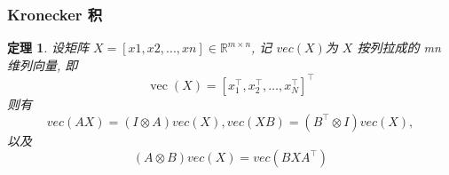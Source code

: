 \documentclass[notheorems,serif]{beamer}
\newcommand{\hei}[1]{{\HEI#1}}
\newtheorem{theorem}{\hei{定理}}
\begin{document}
\begin{frame}
\frametitle{Kronecker 积}
\begin{theorem}
	设矩阵 $X = [x1, x2, . . . , xn] ∈ \mathbb{R}^{
		m×n}$, 记 $vec(X)$为 $X$ 按列拉成的
	mn 维列向量, 即
	$$
	\operatorname{vec}(X)=\left[x_{1}^{\top}, x_{2}^{\top}, \ldots, x_{N}^{\top}\right]^{\top}
	$$
	则有
	$$vec(AX) = (I ⊗ A)vec(X), vec(XB) = (B^{\top}⊗ I)vec(X),$$
	以及
	$$(A ⊗ B)vec(X) = vec(BXA^{\top}
	)$$
\end{theorem}
\end{frame}
\end{document}
